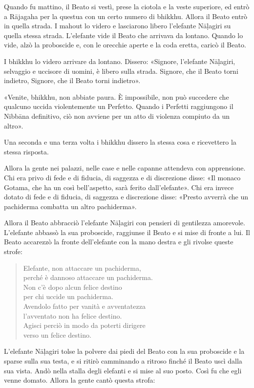 Quando fu mattino, il Beato si vestì, prese la ciotola e la veste superiore, ed
entrò a Rājagaha per la questua con un certo numero di bhikkhu. Allora il Beato
entrò in quella strada. I mahout lo videro e lasciarono libero l’elefante
Nāḷagiri su quella stessa strada. L’elefante vide il Beato che arrivava da
lontano. Quando lo vide, alzò la proboscide e, con le orecchie aperte e la coda
eretta, caricò il Beato.

I bhikkhu lo videro arrivare da lontano. Dissero: «Signore, l’elefante Nāḷagiri,
selvaggio e uccisore di uomini, è libero sulla strada. Signore, che il Beato
torni indietro, Signore, che il Beato torni indietro».

«Venite, bhikkhu, non abbiate paura. È impossibile, non può succedere che
qualcuno uccida violentemente un Perfetto. Quando i Perfetti raggiungono il
Nibbāna definitivo, ciò non avviene per un atto di violenza compiuto da un
altro».

Una seconda e una terza volta i bhikkhu dissero la stessa cosa e ricevettero la
stessa risposta.

Allora la gente nei palazzi, nelle case e nelle capanne attendeva con
apprensione. Chi era privo di fede e di fiducia, di saggezza e di discrezione
disse: «Il monaco Gotama, che ha un così bell’aspetto, sarà ferito
dall’elefante». Chi era invece dotato di fede e di fiducia, di saggezza e
discrezione disse: «Presto avverrà che un pachiderma combatta un altro
pachiderma».

Allora il Beato abbracciò l’elefante Nāḷagiri con pensieri di gentilezza
amorevole. L’elefante abbassò la sua proboscide, raggiunse il Beato e si mise di
fronte a lui. Il Beato accarezzò la fronte dell’elefante con la mano destra e
gli rivolse queste strofe:

\begin{quote}
Elefante, non attaccare un pachiderma, \\
perché è dannoso attaccare un pachiderma. \\
Non c’è dopo alcun felice destino \\
per chi uccide un pachiderma. \\
Avendolo fatto per vanità e avventatezza \\
l’avventato non ha felice destino. \\
Agisci perciò in modo da poterti dirigere \\
verso un felice destino.
\end{quote}

L’elefante Nāḷagiri tolse la polvere dai piedi del Beato con la sua proboscide e
la sparse sulla sua testa, e si ritirò camminando a ritroso finché il Beato uscì
dalla sua vista. Andò nella stalla degli elefanti e si mise al suo posto. Così
fu che egli venne domato. Allora la gente cantò questa strofa:

